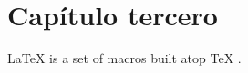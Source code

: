 \chapter{Capítulo tercero}\label{cap:cap3}

\LaTeX{} \cite{latex2e} is a set of macros built atop \TeX{} \cite{texbook}.

